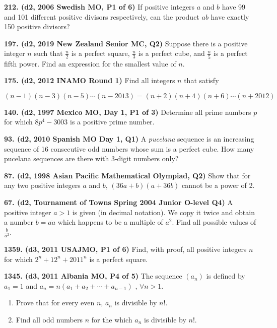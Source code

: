 \documentclass{article}
\begin{document}
\textbf{212. (\color{red}d2\color{black}, 2006 Swedish MO, P1 of 6)} If positive integers \(a\) and \(b\) have 99 and 101 different positive divisors respectively, can the product \(ab\) have exactly 150 positive divisors?

\textbf{197. (\color{red}d2\color{black}, 2019 New Zealand Senior MC, Q2)} Suppose there is a positive integer $n$ such that $\frac{n}{2}$ is a perfect square, $\frac{n}{3}$ is a perfect cube, and $\frac{n}{5}$ is a perfect fifth power. Find an expression for the smallest value of $n$.

\textbf{175. (\color{red}d2\color{black}, 2012 INAMO Round 1)} Find all integers $n$ that satisfy



$(n-1)(n-3)(n-5)\cdots (n-2013) = (n+2)(n+4)(n+6) \cdots (n+2012)$

\textbf{140. (\color{red}d2\color{black}, 1997 Mexico MO, Day 1, P1 of 3)} Determine all prime numbers \(p\) for which \(8p^4 - 3003\) is a positive prime number.

\textbf{93. (\color{red}d2\color{black}, 2010 Spanish MO Day 1, Q1)} A \textit{pucelana} sequence is an increasing sequence of 16 consecutive odd numbers whose sum is a perfect cube. How many pucelana sequences are there with 3-digit numbers only?

\textbf{87. (\color{red}d2\color{black}, 1998 Asian Pacific Mathematical Olympiad, Q2)} Show that for any two positive integers \(a\) and \(b\), \((36a+b)(a+36b)\) cannot be a power of 2.

\textbf{67. (\color{red}d2\color{black}, Tournament of Towns Spring 2004 Junior O-level Q4)} A positive integer $a > 1$ is given (in decimal notation). We copy it twice and obtain a number $b = \overline{aa}$ which happens to be a multiple of $a^2$. Find all possible values of $\frac{b}{a^2}$.

\textbf{1359. (\color{red}d3\color{black}, 2011 USAJMO, P1 of 6)} Find, with proof, all positive integers $n$ for which $2^n + 12^n + 2011^n$ is a perfect square.

\textbf{1345. (\color{red}d3\color{black}, 2011 Albania MO, P4 of 5)} The sequence $(a_{n})$ is defined by $a_1=1$ and $a_n=n(a_1+a_2+\cdots+a_{n-1})$ , $\forall n>1$.
\begin{enumerate}
    \item Prove that for every even $n$, $a_{n}$ is divisible by $n!$.
    \item Find all odd numbers $n$ for the which $a_{n}$ is divisible by $n!$.
\end{enumerate}
\end{document}
